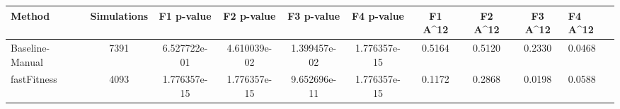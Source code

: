 \begin{tabular}{lcccccccc}
\toprule
         Method &  Simulations &   F1 p-value &   F2 p-value &   F3 p-value &   F4 p-value &  F1 A^12 &  F2 A^12 &  F3 A^12 &  F4 A^12 \\
\midrule
Baseline-Manual &         7391 & 6.527722e-01 & 4.610039e-02 & 1.399457e-02 & 1.776357e-15 &   0.5164 &   0.5120 &   0.2330 &   0.0468 \\
    fastFitness &         4093 & 1.776357e-15 & 1.776357e-15 & 9.652696e-11 & 1.776357e-15 &   0.1172 &   0.2868 &   0.0198 &   0.0588 \\
\bottomrule
\end{tabular}
